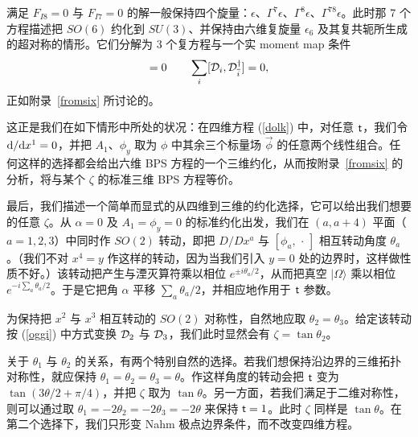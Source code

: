 满足 $F_{I8}=0$ 与 $F_{I7}=0$ 的解一般保持四个旋量：$\epsilon$、$\Gamma^7 \epsilon$、$\Gamma^8 \epsilon$、$\Gamma^{78} \epsilon$。此时那 7 个方程描述把 $SO(6)$ 约化到 $SU(3)$、并保持由六维复旋量 $\epsilon_6$ 及其复共轭所生成的超对称的情形。它们分解为 $3$ 个复方程与一个实 moment map 条件
\begin{equation}
[\D_i, \D_j]=0 \qquad \sum_i [\D_i, \D^\dagger_{\bar i}] =0,
\end{equation}
正如附录~\ref{fromsix} 所讨论的。

这正是我们在如下情形中所处的状况：在四维方程 (\ref{dolk}) 中，对任意 ${ \sf t}$，我们令 ${\mathrm d}/{\mathrm d} x^1=0$，并把 $A_1$、$\phi_y$ 取为 $\phi$ 中其余三个标量场 $\vec \phi$ 的任意两个线性组合。任何这样的选择都会给出六维 BPS 方程的一个三维约化，从而按附录~\ref{fromsix} 的分析，将与某个 $\zeta$ 的标准三维 BPS 方程等价。

最后，我们描述一个简单而显式的从四维到三维的约化选择，它可以给出我们想要的任意 $\zeta$。从 $\alpha=0$ 及 $A_1=\phi_y=0$ 的标准约化出发，我们在 $(a, a+4)$ 平面（$a=1,2,3$）中同时作 $SO(2)$ 转动，即把 $D/Dx^a$ 与 $[\phi_a,\,\cdot\,] $ 相互转动角度 $\theta_a$。（我们不对 $x^4=y$ 作这样的转动，因为当我们引入 $y=0$ 处的边界时，这样做性质不好。）该转动把产生与湮灭算符乘以相位 $e^{\pm i \theta_a/2}$，从而把真空 $|\Omega\rangle$ 乘以相位 $e^{- i \sum_a \theta_a/2}$。于是它把角 $\alpha$ 平移 $\sum_a \theta_a/2$，并相应地作用于 ${ \sf t}$ 参数。


为保持把 $x^2$ 与 $x^3$ 相互转动的 $SO(2)$ 对称性，自然地应取 $\theta_2 = \theta_3$。给定该转动按 (\ref{oggi}) 中方式变换 ${\mathcal D}_2$ 与 ${\mathcal D}_3$，我们此时显然会有 $\zeta = \tan \theta_2$。

关于 $\theta_1$ 与 $\theta_2$ 的关系，有两个特别自然的选择。若我们想保持沿边界的三维拓扑对称性，就应保持 $\theta_1 = \theta_2 = \theta_3=\theta$。作这样角度的转动会把 ${ \sf t}$ 变为 $\tan( 3 \theta/2 + \pi/4)$，并把 $\zeta$ 取为 $\tan \theta$。另一方面，若我们满足于二维对称性，则可以通过取 $\theta_1 = - 2 \theta_2 = - 2 \theta_3 = - 2\theta$ 来保持 ${ \sf t}=1$。此时 $\zeta$ 同样是 $\tan \theta$。在第二个选择下，我们只形变 Nahm 极点边界条件，而不改变四维方程。
